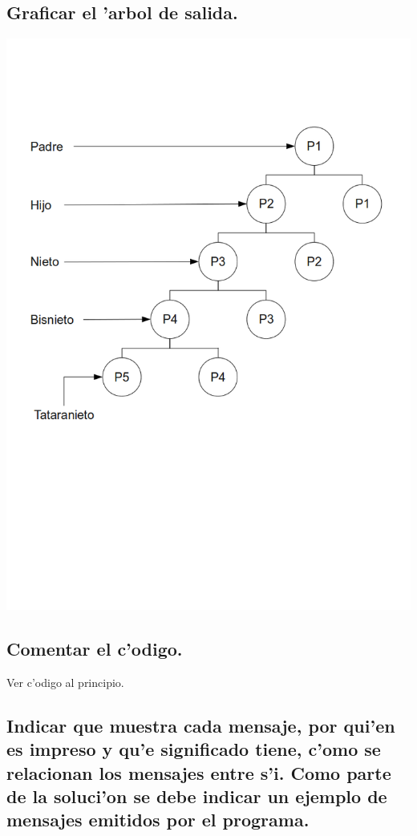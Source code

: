 \documentclass[a4paper,8pt]{article}
\newcommand{\?}{?`}
\begin{document}
\subsection[Punto B]{Graficar el 'arbol de salida.}
\begin{center}
 \includegraphics[scale=0.50,keepaspectratio=true]{./ej1/diagrama-ej1.png}
\end{center}


\subsection[Punto C]{Comentar el c'odigo.}
Ver c'odigo al principio.
\newpage
\subsection[Punto D]{Indicar que muestra cada mensaje, por qui'en es impreso y qu'e significado tiene,
c'omo se relacionan los mensajes entre s'i. Como parte de la soluci'on se debe
indicar un ejemplo de mensajes emitidos por el programa.}
\end{document}

